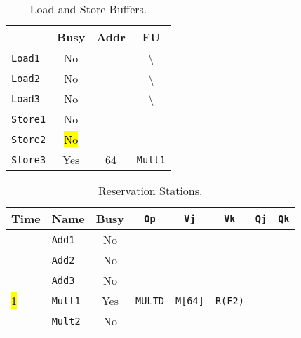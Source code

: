 \begin{enumerate}
    \begin{table}[!htp]
        \centering
        \begin{tabular}{@{} l | c c c @{}}
            \toprule
                                & Busy      & Addr      & FU   \\
            \midrule
            \texttt{Load1}      & No        &           & \textbackslash                    \\ [.3em]
            \texttt{Load2}      & No        &           & \textbackslash                    \\ [.3em]
            \texttt{Load3}      & No        &           & \textbackslash                    \\
            \cmidrule{1-4}
            \texttt{Store1}     & No        &           &                                   \\ [.3em]
            \texttt{Store2}     & \hl{No}   &           &                                   \\ [.3em]
            \texttt{Store3}     & Yes       & 64        & \texttt{Mult1}                    \\
            \bottomrule
        \end{tabular}
        \caption*{Load and Store Buffers.}
    \end{table}

    \begin{table}[!htp]
        \centering
        \begin{tabular}{@{} l l | c c c c c c @{}}
            \toprule
            Time        & Name              & Busy      & \texttt{Op}           & \texttt{Vj}           & \texttt{Vk}           & \texttt{Qj}           & \texttt{Qk}       \\
            \midrule
                        & \texttt{Add1}     & No        &                       &                       &                       &                       &                   \\ [.3em]
                        & \texttt{Add2}     & No        &                       &                       &                       &                       &                   \\ [.3em]
                        & \texttt{Add3}     & No        &                       &                       &                       &                       &                   \\ [.3em]
            \hl{1}      & \texttt{Mult1}    & Yes       & \texttt{MULTD}        & \texttt{M[64]}        & \texttt{R(F2)}        &                       &                   \\ [.3em]
                        & \texttt{Mult2}    & No        &                       &                       &                       &                       &                   \\
            \bottomrule
        \end{tabular}
        \caption*{Reservation Stations.}
    \end{table}


\end{enumerate}

